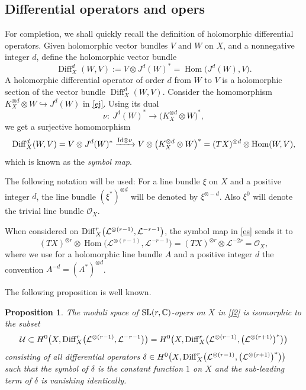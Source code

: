 \documentclass[10pt,a4paper]{amsart}
\numberwithin{equation}{section}
\newtheorem{Proposition}[Theorem]{Proposition}
 { \theoremstyle{definition}
\newtheorem{Definition}[Theorem]{Definition}
\newtheorem{Note}[Theorem]{Note}
\newtheorem{Example}[Theorem]{Example}
\newtheorem{Remark}[Theorem]{Remark} }
\begin{document}
\subsection{Differential operators and opers}

For completion, we shall quickly recall the definition of holomorphic differential operators. Given holomorphic
vector bundles $V$ and $W$ on $X$, and a nonnegative integer $d$, define the holomorphic vector bundle
\[
\operatorname{Diff}^d_X(W, V) := V\otimes J^d(W)^* = \operatorname{Hom}\bigl(J^d(W), V\bigr).
\]
A holomorphic differential operator of order $d$ from $W$ to $V$ is a holomorphic
section of the vector bundle $\operatorname{Diff}^d_X(W, V)$.
Consider the homomorphism $K^{\otimes d}_X\otimes W \hookrightarrow J^d(W)$
in \eqref{ej}. Using its dual%
\[
\nu\colon\ J^d(W)^* \longrightarrow \bigl(K^{\otimes d}_X\otimes W\bigr)^*,
\]
we get a surjective homomorphism
\begin{equation}\label{es}
\operatorname{Diff}^d_X(W, V) = V\otimes J^d(W)^*
 \xrightarrow{ {\rm Id}\otimes\nu } V\otimes \bigl(K^{\otimes d}_X\otimes W\bigr)^*
 = (TX)^{\otimes d}\otimes \operatorname{Hom}(W, V),
\end{equation}
which is known as the {\it symbol map}.

The following notation will be used: For a line bundle $\xi$ on $X$ and a positive integer $d$, the line bundle
$(\xi^*)^{\otimes d}$ will be denoted by $\xi^{\otimes -d}$. Also $\xi^0$ will denote the trivial line bundle
${\mathcal O}_X$.

When considered on
${\rm Diff}^r_X\bigl({\mathcal L}^{\otimes (r-1)},
{\mathcal L}^{-r-1}\bigr)$, the symbol map in \eqref{es} sends it to
\[
(TX)^{\otimes r}\otimes \operatorname{Hom}\bigl({\mathcal L}^{\otimes (r-1)}, {\mathcal L}^{-r-1}\bigr)
 = (TX)^{\otimes r}\otimes {\mathcal L}^{-2r} = {\mathcal O}_X,
\]
where we use for a holomorphic line bundle $A$ and a positive integer $d$ the convention ${A^{-d}\!\!=\!(\!A^*\!)^{\otimes d}}$\!.

The following proposition is well known.

\begin{Proposition}\label{f3}
The moduli space of ${\rm SL}(r, {\mathbb C})$-opers on $X$ in \eqref{f2} is isomorphic to the subset
\begin{gather}
\mathcal U \subset H^0\bigl(X, {\rm Diff}^r_X\bigl({\mathcal L}^{\otimes (r-1)},
{\mathcal L}^{-r-1}\bigr)\bigr) = H^0\bigl(X,
{\rm Diff}^r_X\bigl({\mathcal L}^{\otimes (r-1)}, \bigl({\mathcal L}^{\otimes (r+1)}\bigr)^*\bigr)\bigr)\nonumber
\end{gather}
consisting of all differential operators $\delta \in H^0\bigl(X, {\rm Diff}^r_X\bigl({\mathcal
L}^{\otimes (r-1)}, \bigl({\mathcal L}^{\otimes (r+1)}\bigr)^*\bigr)\bigr)$ such that the symbol of $\delta$
is the constant function $1$ on $X$ and the sub-leading term of $\delta$ is vanishing
identically.
\end{Proposition}
\end{document}
